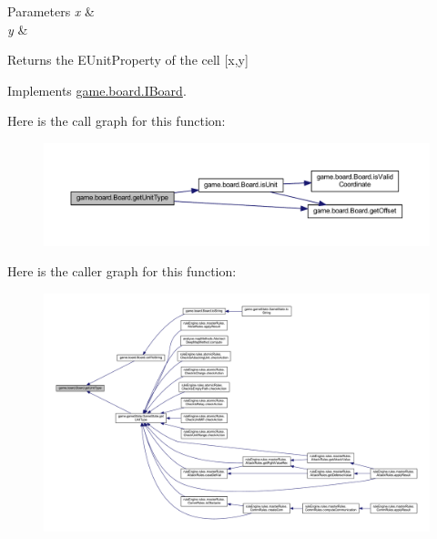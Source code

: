 \begin{DoxyParams}{Parameters}
{\em x} & \\
\hline
{\em y} & \\
\hline
\end{DoxyParams}
\begin{DoxyReturn}{Returns}
the E\+Unit\+Property of the cell \mbox{[}x,y\mbox{]} 
\end{DoxyReturn}


Implements \mbox{\hyperlink{interfacegame_1_1board_1_1_i_board_a3454c1934e15ea532165597697e1f73d}{game.\+board.\+I\+Board}}.

Here is the call graph for this function\+:
\nopagebreak
\begin{figure}[H]
\begin{center}
\leavevmode
\includegraphics[width=350pt]{classgame_1_1board_1_1_board_a86eddc47b7951c2e74f9acfb5d8ad2e1_cgraph}
\end{center}
\end{figure}
Here is the caller graph for this function\+:
\nopagebreak
\begin{figure}[H]
\begin{center}
\leavevmode
\includegraphics[width=350pt]{classgame_1_1board_1_1_board_a86eddc47b7951c2e74f9acfb5d8ad2e1_icgraph}
\end{center}
\end{figure}
\mbox{\label{classgame_1_1board_1_1_board_a23a469b1b268da78b39c584bc20bb4cd}} 
